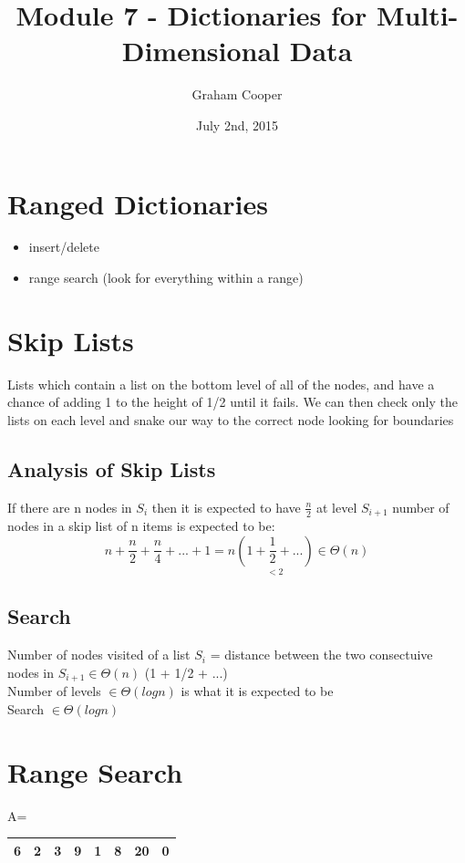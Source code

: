 \documentclass[12pt]{article}
\title{\vspace{-15ex}Module 7 - Dictionaries for Multi-Dimensional Data\vspace{-1ex}}
\date{July 2nd, 2015}
\author{Graham Cooper}
\begin{document}
	\maketitle
	
	\section*{Ranged Dictionaries}
	\begin{itemize}
		\item insert/delete
		\item range search (look for everything within a range)
	\end{itemize}
	
	\section*{Skip Lists}
	Lists which contain a list on the bottom level of all of the nodes, and have a chance of adding 1 to the height of 1/2 until it fails. We can then check only the lists on each level and snake our way to the correct node looking for boundaries\\
	
	\subsection*{Analysis of Skip Lists}
	If there are n nodes in $S_i$ then it is expected to have $\frac{n}{2}$ at level $S_{i+1}$ number of nodes in a skip list of n items is expected to be:\\
	$$n + \frac{n}{2} + \frac{n}{4} + ... + 1 = n\underset{< 2}{(1 + \frac{1}{2} + ...)} \in \Theta(n)$$
	
	\subsection{Search}
	Number of nodes visited of a list $S_i$ = distance between the two consectuive nodes in $S_{i+1} \in \Theta(n)$ (1 + 1/2 + ...)\\
	Number of levels $\in \Theta(logn)$ is what it is expected to be\\
	
	Search $\in \Theta(logn)$\\
	
	\section{Range Search}
	A=
	\begin{tabular}{|c | c | c | c | c | c | c | c |}
		\hline
		6 & 2 & 3 & 9 & 1 & 8 & 20 & 0 \\ \hline
	\end{tabular}
	
\end{document}
